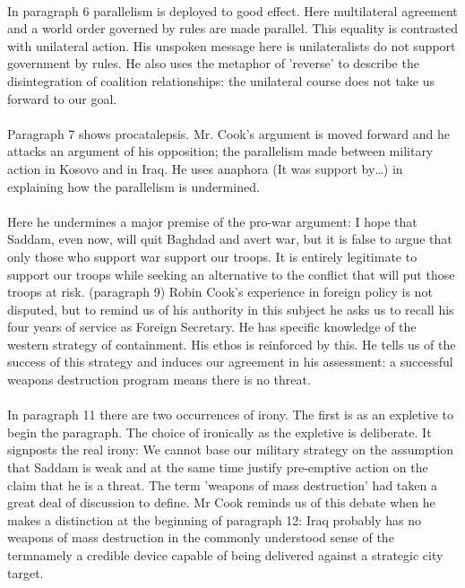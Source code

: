 \documentclass{article}
\begin{document}
\begin{onehalfspace}
\paragraph{}In paragraph 6 parallelism is deployed to good effect. Here multilateral agreement and a world order governed by rules are made parallel. This equality is contrasted with unilateral  action. His unspoken message here is unilateralists do not support government by rules. He also uses the metaphor of 'reverse'  to describe the disintegration of coalition relationships: the unilateral course does not take us forward to our goal. 

\paragraph{}Paragraph 7 shows procatalepsis. Mr. Cook's argument is moved forward and he attacks an argument of his opposition; the parallelism made between military action in Kosovo and in Iraq. He uses anaphora (It was support by\ldots) in explaining how the parallelism is undermined. 

\paragraph{}Here he undermines a major premise of the pro-war argument: I hope that Saddam, even now, will quit Baghdad and avert war, but it is false to argue that only those who support war support our troops. It is entirely legitimate to support our troops while seeking an alternative to the conflict that will put those troops at risk. (paragraph 9) Robin Cook's experience in foreign policy is not disputed, but to remind us of his authority in this subject he asks us to recall his four years of service as Foreign Secretary. He has specific knowledge of the western strategy of containment. His ethos is reinforced by this. He tells us of the success of this strategy and induces our agreement in his assessment: a successful weapons destruction program means there is no threat. 

\paragraph{}In paragraph 11 there are two occurrences of irony. The first is as an expletive to begin the paragraph. The choice of ironically as the expletive is deliberate. It signposts the real irony: We cannot base our military strategy on the assumption that Saddam is weak and at the same time justify pre-emptive action on the claim that he is a threat. The term 'weapons of mass destruction' had taken a great deal of discussion to define. Mr Cook reminds us of this debate when he makes a distinction at the beginning of paragraph 12: Iraq probably has no weapons of mass destruction in the commonly understood sense of the termnamely a credible device capable of being delivered against a strategic city 
target. 


\end{onehalfspace}
\end{document}
